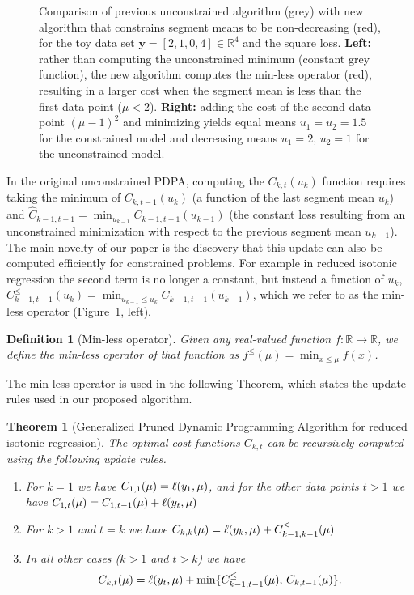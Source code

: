 \documentclass[aoas]{imsart}
\newtheorem{theorem}{Theorem}
\newtheorem{definition}{Definition}
\newcommand{\RR}{\mathbb R}
\begin{document}
\begin{figure}[t!]
  \centering
  
  
  \vskip -0.5cm
  \caption{Comparison of previous unconstrained algorithm
    (\textcolor{Min}{grey}) with new algorithm that constrains segment
    means to be non-decreasing (\textcolor{Ckt}{red}), for the toy data
    set $\mathbf y= [ 2, 1, 0, 4 ] \in\RR^4$ and the square
    loss. \textbf{Left:} rather than computing the unconstrained
    minimum (constant grey function), the new algorithm computes the
    min-less operator (red), resulting in a larger cost when the
    segment mean is less than the first data point ($\mu <
    2$). \textbf{Right:} adding the cost of the second data point
    $(\mu-1)^2$ and minimizing yields equal means $u_1=u_2=1.5$ for
    the constrained model and decreasing means $u_1=2,\, u_2=1$ for
    the unconstrained model.}
  \label{fig:compare-unconstrained}
\end{figure}

In the original unconstrained PDPA, computing the $C_{k,t}(u_k)$
function requires taking the minimum of $C_{k,t-1}(u_k)$ (a function
of the last segment mean $u_k$) and
$\hat C_{k-1,t-1} = \min_{u_{k-1}} C_{k-1,t-1}(u_{k-1})$ (the constant
loss resulting from an unconstrained minimization with respect to the
previous segment mean $u_{k-1}$). The main novelty of our paper is the
discovery that this update can also be computed efficiently for
constrained problems. For example in reduced isotonic regression the second
term is no longer a constant, but instead a function of $u_k$,
$C_{k-1,t-1}^{\leq}(u_k) = \min_{u_{k-1}\leq u_k}
C_{k-1,t-1}(u_{k-1})$, which we refer to as the min-less operator
(Figure~\ref{fig:compare-unconstrained}, left).

\begin{definition}[Min-less operator]
\label{def:min-less}
  Given any real-valued function $f:\RR\rightarrow\RR$, we define the min-less
  operator of that function as $f^\leq(\mu)=\min_{x\leq \mu} f(x)$.
\end{definition}

The min-less operator is used in the following Theorem, which states
the update rules used in our proposed algorithm.

\begin{theorem}[Generalized Pruned Dynamic Programming Algorithm
  for reduced isotonic regression]
\label{thm:gpdpa}
  The optimal cost functions $C_{k,t}$ can be recursively computed
  using the following update rules.
\begin{enumerate}
\item For $k=1$ we have
$C_{1,1}(\mu)=\ell(y_1,\mu)$, and for the other data
  points $t>1$ we have
$
C_{1,t}(\mu)=C_{1,t-1}(\mu)+\ell(y_t,\mu)
$
\item For $k>1$ and $t=k$ we have
$
  C_{k,k}(\mu)=\ell(y_k, \mu)+C_{k-1,k-1}^\leq(\mu)
$
\item In all other cases ($k>1$ and $t>k$) we have
 $$
  C_{k,t}(\mu)=\ell(y_t,\mu)+
  \min\{
  C_{k-1,t-1}^\leq(\mu),\,
  C_{k,t-1}(\mu)
  \}.
$$
\end{enumerate}
\end{theorem}
\end{document}

